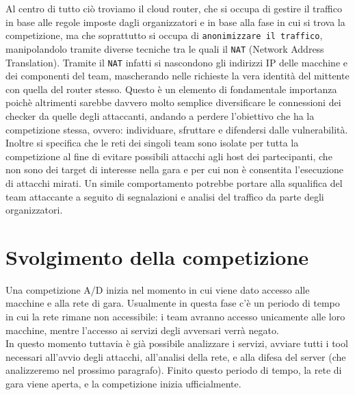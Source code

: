 Al centro di tutto ciò troviamo il cloud router, che si occupa di gestire il traffico in base alle regole imposte dagli organizzatori e in base alla fase in cui si trova la competizione, ma che soprattutto si occupa di \texttt{anonimizzare il traffico}, manipolandolo tramite diverse tecniche tra le quali il \texttt{NAT} (Network Address Translation). Tramite il \texttt{NAT} infatti si nascondono gli indirizzi IP delle macchine e dei componenti del team, mascherando nelle richieste la vera identità del mittente con quella del router stesso. Questo è un elemento di fondamentale importanza poichè altrimenti sarebbe davvero molto semplice diversificare le connessioni dei checker da quelle degli attaccanti, andando a perdere l'obiettivo che ha la competizione stessa, ovvero: individuare, sfruttare e difendersi dalle vulnerabilità.\\

Inoltre si specifica che le reti dei singoli team sono isolate per tutta la competizione al fine di evitare possibili attacchi agli host dei partecipanti, che non sono dei target di interesse nella gara e per cui non è consentita l'esecuzione di attacchi mirati.
Un simile comportamento potrebbe portare alla squalifica del team attaccante a seguito di segnalazioni e analisi del traffico da parte degli organizzatori.

\section{Svolgimento della competizione}

Una competizione A/D inizia nel momento in cui viene dato accesso alle macchine e alla rete di gara. Usualmente in questa fase c'è un periodo di tempo in cui la rete rimane non accessibile: i team avranno accesso unicamente alle loro macchine, mentre l'accesso ai servizi degli avversari verrà negato.\\

In questo momento tuttavia è già possibile analizzare i servizi, avviare tutti i tool necessari all'avvio degli attacchi, all'analisi della rete, e alla difesa del server (che analizzeremo nel prossimo paragrafo). Finito questo periodo di tempo, la rete di gara viene aperta, e la competizione inizia ufficialmente.\\

